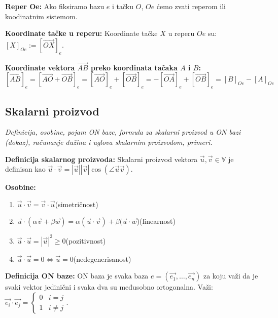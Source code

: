 \documentclass[12pt]{article}
\newcommand{\vek}[1]{\overrightarrow{#1}}
\begin{document}
\textbf{Reper Oe:} Ako fiksiramo bazu $e$ i tačku $O$, $Oe$ ćemo zvati reperom
ili koodinatnim sistemom.
\par

\textbf{Koordinate tačke u reperu:} Koordinate tačke $X$ u reperu $Oe$ su:
$[X]_{Oe}:=[\vek{OX}]_e$.
\par

\textbf{Koordinate vektora $\vek{AB}$ preko koordinata tačaka $A$ i $B$:}
$$[\vek{AB}]_e=[\vek{AO}+\vek{OB}]_e=[\vek{AO}]_e+[\vek{OB}]_e=
    -[\vek{OA}]_e+[\vek{OB}]_e=[B]_{Oe}-[A]_{Oe}$$


\subsection{Skalarni proizvod}
\textit{Definicija, osobine, pojam ON baze, formula za skalarni proizvod u ON
    bazi (dokaz), računanje dužina i uglova skalarnim proizvodom, primeri.}
\par
\vspace*{1cm}

\textbf{Definicija skalarnog proizvoda:} Skalarni proizvod vektora
$\vek{u},\vek{v}\in\mathbb{V}$ je definisan kao $\vek{u}\cdot\vek{v}=|\vek{u}|
    |\vek{v}|\cos(\angle{\vek{u}\vek{v}})$.
\par

\textbf{Osobine:}
\begin{enumerate}[label=\textbf{(\arabic*)}]
    \item $\vek{u}\cdot\vek{v}=\vek{v}\cdot\vek{u}$\hspace*{1cm}(simetričnost)
    \item $\vek{u}\cdot(\alpha\vek{v}+\beta\vek{w})=\alpha(\vek{u}\cdot\vek{v})
          +\beta(\vek{u}\cdot\vek{w}$)\hspace*{1cm}(linearnost)
    \item $\vek{u}\cdot\vek{u}=|\vek{u}|^2\geq0$\hspace*{1cm}(pozitivnost)
    \item $\vek{u}\cdot\vek{u}=0\iff\vek{u}=0$\hspace*{1cm}(nedegenerisanost)
\end{enumerate}
\par

\textbf{Definicija ON baze:} ON baza je svaka baza $e=(\vek{e_1},\dotsc,
    \vek{e_n})$ za koju važi da je svaki vektor jedinični i svaka dva su
međusobno ortogonalna. Važi: $\vek{e_i}\cdot\vek{e_j} =
    \begin{cases}
        0 & i=j     \\
        1 & i\neq j
    \end{cases}$.
\par
\end{document}
